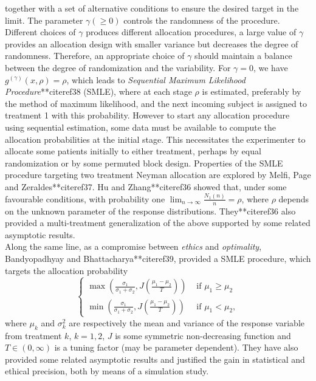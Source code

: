  together with a set of alternative conditions to ensure the desired target in the limit. The parameter $\gamma(\geq 0)$ controls the
randomness of the procedure. Different choices of $\gamma$ produces
different allocation procedures, a large value of $\gamma$ provides
an allocation design with smaller variance but decreases the degree
of randomness. Therefore, an appropriate choice of $\gamma$ should
maintain a balance between the degree of randomization and the
variability. For $\gamma=0$, we have $g^{(\gamma)}(x,\rho)=\rho$,
which leads to \textit{Sequential Maximum Likelihood Procedure}**citeref{38}
(SMLE), where at each stage $\rho$ is estimated, preferably by the method of maximum likelihood, and the next incoming subject is assigned to treatment 1 with this probability. However to start any allocation procedure using sequential estimation, some data must be available to compute the
allocation probabilities at the initial stage. This necessitates the
experimenter to allocate some patients initially to either treatment, perhaps by equal randomization or by some permuted block design. Properties of the SMLE procedure targeting two treatment Neyman allocation are explored by  Melfi, Page and Zeraldes**citeref{37}. Hu and Zhang**citeref{36} showed that, under some favourable conditions, with probability one $\lim_{n\rightarrow\infty}\frac{N_{1}(n)}{n}=\rho$, where $\rho$
depends on the unknown parameter of the response distributions. They**citeref{36} also provided a multi-treatment generalization of
the above supported by some related asymptotic results.\\

\noindent Along the same line, as a compromise between
\textit{ethics} and \textit{optimality}, Bandyopadhyay and Bhattacharya**citeref{39}, provided a SMLE procedure, which targets the allocation probability
\[\left\{
\begin{array}{ll}
\max \left( \frac {\sigma_1}{\sigma_1 + \sigma_2},
J(\frac{\mu_1-\mu_2}{T}) \right) & \mbox{ if } \mu_1 \geq \mu_2\\
\min \left( \frac
{\sigma_1}{\sigma_1 + \sigma_2} ,J(\frac{\mu_1-\mu_2}{T}) \right) & \mbox{ if } \mu_1 < \mu_2,
\end{array}
\right. \]
where $\mu_{k}$ and  $\sigma^{2}_k$ are respectively the mean and variance of the response variable from treatment $k$, $k=1,2$, $J$ is some symmetric non-decreasing function and $T\in(0,\infty)$ is a tuning factor (may be parameter dependent). They have also provided some related asymptotic results and justified the gain in statistical and ethical precision, both by means of a simulation study.

